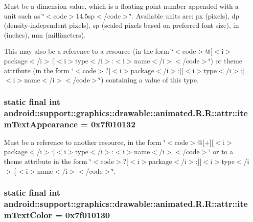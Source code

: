 Must be a dimension value, which is a floating point number appended with a unit such as \char`\"{}$<$code$>$14.5sp$<$/code$>$\char`\"{}. Available units are: px (pixels), dp (density-independent pixels), sp (scaled pixels based on preferred font size), in (inches), mm (millimeters). 

This may also be a reference to a resource (in the form \char`\"{}$<$code$>$@\mbox{[}$<$i$>$package$<$/i$>$:\mbox{]}$<$i$>$type$<$/i$>$:$<$i$>$name$<$/i$>$$<$/code$>$\char`\"{}) or theme attribute (in the form \char`\"{}$<$code$>$?\mbox{[}$<$i$>$package$<$/i$>$:\mbox{]}\mbox{[}$<$i$>$type$<$/i$>$:\mbox{]}$<$i$>$name$<$/i$>$$<$/code$>$\char`\"{}) containing a value of this type. \hypertarget{classandroid_1_1support_1_1graphics_1_1drawable_1_1animated_1_1_r_1_1attr_6ba0754fc56d8ba8b4f86a055081deb6}{
\subsubsection[{itemTextAppearance}]{\setlength{\rightskip}{0pt plus 5cm}static final int android::support::graphics::drawable::animated.R.R::attr::itemTextAppearance = 0x7f010132}}
\label{classandroid_1_1support_1_1graphics_1_1drawable_1_1animated_1_1_r_1_1attr_6ba0754fc56d8ba8b4f86a055081deb6}


Must be a reference to another resource, in the form \char`\"{}$<$code$>$@\mbox{[}+\mbox{]}\mbox{[}$<$i$>$package$<$/i$>$:\mbox{]}$<$i$>$type$<$/i$>$:$<$i$>$name$<$/i$>$$<$/code$>$\char`\"{} or to a theme attribute in the form \char`\"{}$<$code$>$?\mbox{[}$<$i$>$package$<$/i$>$:\mbox{]}\mbox{[}$<$i$>$type$<$/i$>$:\mbox{]}$<$i$>$name$<$/i$>$$<$/code$>$\char`\"{}. \hypertarget{classandroid_1_1support_1_1graphics_1_1drawable_1_1animated_1_1_r_1_1attr_a242b2f85a442e3104a75f57f97ae835}{
\subsubsection[{itemTextColor}]{\setlength{\rightskip}{0pt plus 5cm}static final int android::support::graphics::drawable::animated.R.R::attr::itemTextColor = 0x7f010130}}
\label{classandroid_1_1support_1_1graphics_1_1drawable_1_1animated_1_1_r_1_1attr_a242b2f85a442e3104a75f57f97ae835}


